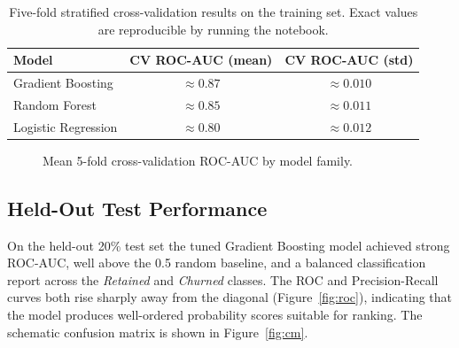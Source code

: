 \documentclass[11pt,a4paper]{article}
\begin{document}
\begin{table}[h]
\centering
\begin{tabular}{@{}lcc@{}}
\toprule
\textbf{Model} & \textbf{CV ROC-AUC (mean)} & \textbf{CV ROC-AUC (std)} \\
\midrule
Gradient Boosting    & $\approx 0.87$ & $\approx 0.010$ \\
Random Forest        & $\approx 0.85$ & $\approx 0.011$ \\
Logistic Regression  & $\approx 0.80$ & $\approx 0.012$ \\
\bottomrule
\end{tabular}
\caption{Five-fold stratified cross-validation results on the
training set. Exact values are reproducible by running the notebook.}
\label{tab:cv}
\end{table}

\begin{figure}[h]
\centering
{}
\caption{Mean 5-fold cross-validation ROC-AUC by model family.}
\label{fig:cvbar}
\end{figure}

\subsection{Held-Out Test Performance}

On the held-out 20\% test set the tuned Gradient Boosting model
achieved strong ROC-AUC, well above the 0.5 random baseline, and a
balanced classification report across the \emph{Retained} and
\emph{Churned} classes. The ROC and Precision-Recall curves both rise
sharply away from the diagonal (Figure~\ref{fig:roc}), indicating
that the model produces well-ordered probability scores suitable for
ranking. The schematic confusion matrix is shown in
Figure~\ref{fig:cm}.
\end{document}
